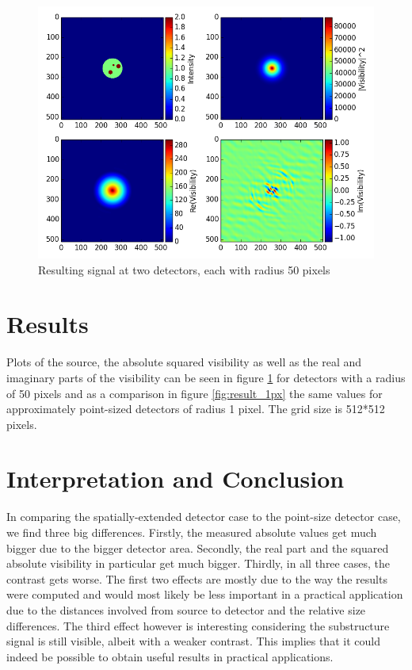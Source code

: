 \documentclass{article}
\begin{document}
\begin{figure}[ht!]
	\centering
    \includegraphics[scale=0.51]{figure_results}
    \caption{Resulting signal at two detectors, each with radius 50 pixels \label{fig:result_50px}
 }
\end{figure}
\section{Results}\label{results}

Plots of the source, the absolute squared visibility as well as the real and imaginary parts of the visibility can be seen in figure \ref{fig:result_50px} for detectors with a radius of 50 pixels and as a comparison in figure \ref{fig:result_1px} the same values for approximately point-sized detectors of radius 1 pixel. The grid size is 512*512 pixels.


\section{Interpretation and Conclusion}\label{conclusion}
In comparing the spatially-extended detector case to the point-size detector case, we find three big differences. Firstly, the measured absolute values get much bigger due to the bigger detector area. Secondly, the real part and the squared absolute visibility in particular get much bigger. Thirdly, in all three cases, the contrast gets worse. The first two effects are mostly due to the way the results were computed and would most likely be less important in a practical application due to the distances involved from source to detector and the relative size differences. The third effect however is interesting considering the substructure signal is still visible, albeit with a weaker contrast. This implies that it could indeed be possible to obtain useful results in practical applications. \\

\appendix
\label{app:a}




\end{document}
